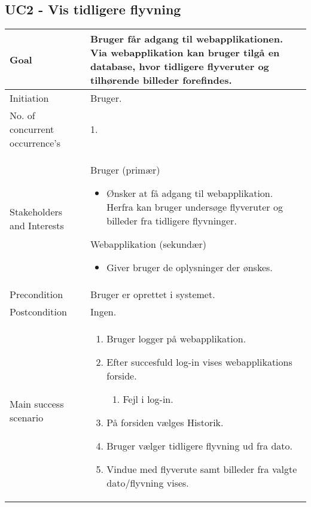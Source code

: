 \subsection*{UC2 - Vis tidligere flyvning}

\begin{table}[H]
\begin{tabular}{|l|p{10cm}|}
\hline

Goal	 								& Bruger får adgang til webapplikationen. Via webapplikation kan bruger tilgå en
database, hvor tidligere flyveruter og tilhørende billeder forefindes. \\\hline
Initiation 							& Bruger. \\\hline
No. of concurrent occurrence’s		& 1. \\\hline
Stakeholders	and Interests			& Bruger (primær) 
										\begin{itemize}
											\item Ønsker at få adgang til webapplikation. Herfra kan bruger
undersøge flyveruter og billeder fra tidligere flyvninger.
										\end{itemize} 
									  Webapplikation (sekundær)
										\begin{itemize}
											\item Giver bruger de oplysninger der ønskes.
										\end{itemize} \\\hline
Precondition							& Bruger er oprettet i systemet. \\\hline
Postcondition						& Ingen. \\\hline
Main success scenario				&
 
									\renewcommand{\labelenumi}{\arabic{enumi}.}
									\renewcommand{\labelenumii}{\Roman{enumii}:}

									\begin{enumerate}[topsep=0.0cm, leftmargin=0.5cm]
										\item Bruger logger på webapplikation.
										\item Efter succesfuld log-in vises webapplikations forside.
											\begin{enumerate}[partopsep=4cm, topsep=0cm, leftmargin=1cm]
												\item Fejl i log-in.
											\end{enumerate}
										\item På forsiden vælges Historik.
										\item Bruger vælger tidligere flyvning ud fra dato.	
										\item Vindue med flyverute samt billeder fra valgte dato/flyvning vises.
									\end{enumerate} \\\hline	


\end{tabular}
\end{table}
